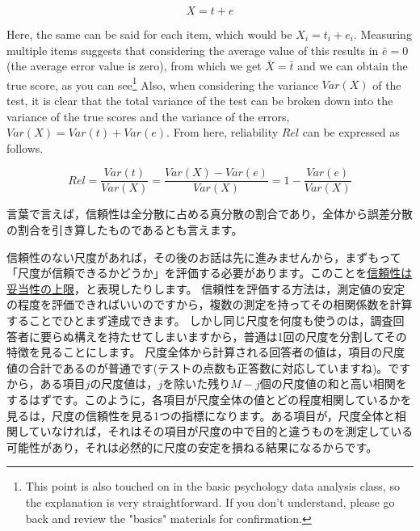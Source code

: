 \documentclass{ltjsbook}
\begin{document}
\[ X = t + e \]

Here, the same can be said for each item, which would be $X_i = t_i + e_i$. Measuring multiple items suggests that considering the average value of this results in $\bar{e}=0$ (the average error value is zero), from which we get $\bar{X}=\bar{t}$ and we can obtain the true score, as you can see\footnote{This point is also touched on in the basic psychology data analysis class, so the explanation is very straightforward. If you don't understand, please go back and review the "basics" materials for confirmation.}
Also, when considering the variance $Var(X)$ of the test, it is clear that the total variance of the test can be broken down into the variance of the true scores and the variance of the errors, $Var(X)=Var(t)+Var(e)$. From here, reliability $Rel$ can be expressed as follows.

\[Rel = \frac{Var(t)}{Var(X)}= \frac{Var(X)-Var(e)}{Var(X)} = 1-\frac{Var(e)}{Var(X)}\]

言葉で言えば，信頼性は全分散に占める真分散の割合であり，全体から誤差分散の割合を引き算したものであるとも言えます。

信頼性のない尺度があれば，その後のお話は先に進みませんから，まずもって「尺度が信頼できるかどうか」を評価する必要があります。このことを\underline{信頼性は妥当性の上限}，と表現したりします。
信頼性を評価する方法は，測定値の安定の程度を評価できればいいのですから，複数の測定を持ってその相関係数を計算することでひとまず達成できます。
しかし同じ尺度を何度も使うのは，調査回答者に要らぬ構えを持たせてしまいますから，普通は1回の尺度を分割してその特徴を見ることにします。
尺度全体から計算される回答者の値は，項目の尺度値の合計であるのが普通です(テストの点数も正答数に対応していますね)。ですから，ある項目$j$の尺度値は，$j$を除いた残り$M-j$個の尺度値の和と高い相関をするはずです。このように，各項目が尺度全体の値とどの程度相関しているかを見るは，尺度の信頼性を見る1つの指標になります。ある項目が，尺度全体と相関していなければ，それはその項目が尺度の中で目的と違うものを測定している可能性があり，それは必然的に尺度の安定を損ねる結果になるからです。
\end{document}
